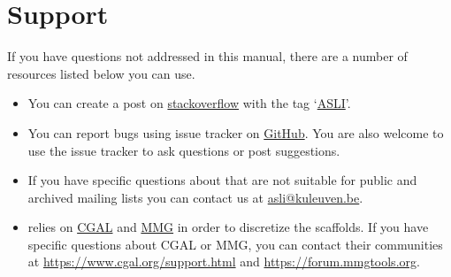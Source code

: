 \section{Support} \label{sec:questions-and-answers}
If you have questions not addressed in this manual, there are a number of resources listed below you can use.

\begin{itemize}
\item You can create a post on \href{https://stackoverflow.com/questions/tagged/ASLI}{stackoverflow} with the tag `\href{https://stackoverflow.com/questions/tagged/ASLI}{ASLI}'.

\item You can report bugs using \asli{} issue tracker on \href{https://github.com/tpms-lattice/ASLI/issues}{GitHub}. You are also welcome to use the issue tracker to ask questions or post suggestions.

\item If you have specific questions about \asli{} that are not suitable for public and archived mailing lists you can contact us at \url{asli@kuleuven.be}.
  
\item \asli{} relies on \href{https://www.cgal.org/}{CGAL} and \href{https://www.mmgtools.org/}{MMG} in order to discretize the scaffolds. If you have specific questions about CGAL or MMG, you can contact their communities at \url{https://www.cgal.org/support.html} and \url{https://forum.mmgtools.org}.
\end{itemize}
